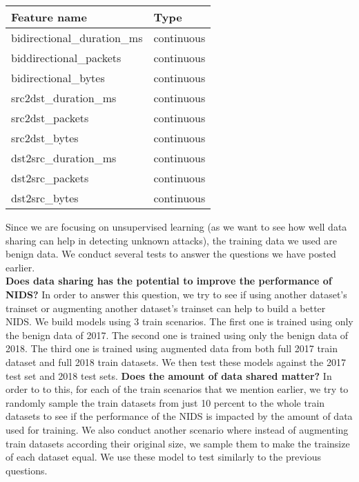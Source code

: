 \begin{method}
\begin{table}[!ht]
    \centering
    \begin{tabular}{|l|l|}
    \hline
        Feature name & Type \\ \hline
        bidirectional\_duration\_ms & continuous \\ \hline
        biddirectional\_packets & continuous \\ \hline
        bidirectional\_bytes & continuous \\ \hline
        src2dst\_duration\_ms & continuous \\ \hline
        src2dst\_packets & continuous \\ \hline
        src2dst\_bytes & continuous \\ \hline
        dst2src\_duration\_ms & continuous \\ \hline
        dst2src\_packets & continuous \\ \hline
        dst2src\_bytes & continuous \\ \hline
    \end{tabular}
\end{table}





Since we are focusing on unsupervised learning (as we want to see how well data sharing can help in detecting unknown attacks), the training data we used are benign data. We conduct several tests to answer the questions we have posted earlier. \\
\textbf{Does data sharing has the potential to improve the performance of NIDS?} 
In order to answer this question, we try to see if using another dataset's trainset or augmenting another dataset's trainset can help to build a better NIDS. We build models using 3 train scenarios. The first one is trained using only the benign data of 2017. The second one is trained using only the benign data of 2018. The third one is trained using augmented data from both full 2017 train dataset and full 2018 train datasets. We then test these models against the 2017 test set and 2018 test sets.
\textbf{Does the amount of data shared matter?} 
In order to to this, for each of the train scenarios that we mention earlier, we try to randomly sample the train datasets from just 10 percent to the whole train datasets to see if the performance of the NIDS is impacted by the amount of data used for training. We also conduct another scenario where instead of augmenting train datasets according their original size, we sample them to make the trainsize of each dataset equal. We use these model to test similarly to the previous questions.


\end{method}
